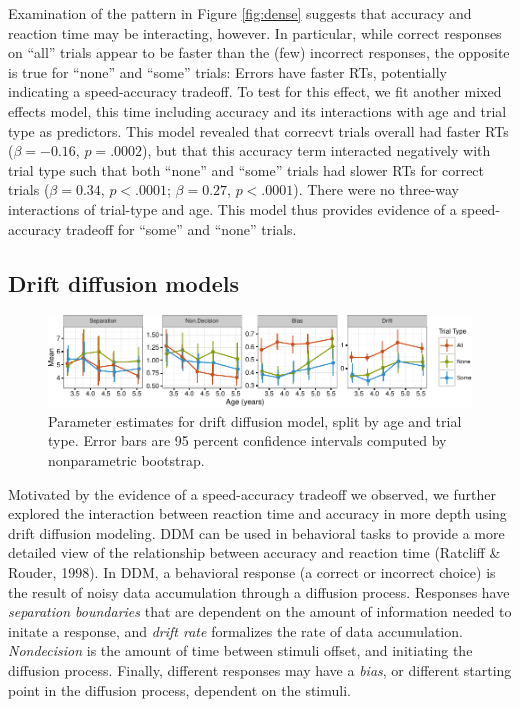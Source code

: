 \documentclass[10pt, letterpaper]{article}
\newenvironment{CodeChunk}{}{}
\begin{document}
Examination of the pattern in Figure \ref{fig:dense} suggests that
accuracy and reaction time may be interacting, however. In particular,
while correct responses on ``all'' trials appear to be faster than the
(few) incorrect responses, the opposite is true for ``none'' and
``some'' trials: Errors have faster RTs, potentially indicating a
speed-accuracy tradeoff. To test for this effect, we fit another mixed
effects model, this time including accuracy and its interactions with
age and trial type as predictors. This model revealed that correcvt
trials overall had faster RTs (\(\beta = -0.16\), \(p = .0002\)), but
that this accuracy term interacted negatively with trial type such that
both ``none'' and ``some'' trials had slower RTs for correct trials
(\(\beta = 0.34\), \(p < .0001\); \(\beta = 0.27\), \(p < .0001\)).
There were no three-way interactions of trial-type and age. This model
thus provides evidence of a speed-accuracy tradeoff for ``some'' and
``none'' trials.

\subsection{Drift diffusion models}\label{drift-diffusion-models}

\begin{CodeChunk}
\begin{figure}[t]

{\centering \includegraphics{figs/devo_param_plot-1} 

}

\caption[Parameter estimates for drift diffusion model, split by age and trial type]{Parameter estimates for drift diffusion model, split by age and trial type. Error bars are 95 percent confidence intervals computed by nonparametric bootstrap.}\label{fig:devo_param_plot}
\end{figure}
\end{CodeChunk}

Motivated by the evidence of a speed-accuracy tradeoff we observed, we
further explored the interaction between reaction time and accuracy in
more depth using drift diffusion modeling. DDM can be used in behavioral
tasks to provide a more detailed view of the relationship between
accuracy and reaction time (Ratcliff \& Rouder, 1998). In DDM, a
behavioral response (a correct or incorrect choice) is the result of
noisy data accumulation through a diffusion process. Responses have
\emph{separation boundaries} that are dependent on the amount of
information needed to initate a response, and \emph{drift rate}
formalizes the rate of data accumulation. \emph{Nondecision} is the
amount of time between stimuli offset, and initiating the diffusion
process. Finally, different responses may have a \emph{bias}, or
different starting point in the diffusion process, dependent on the
stimuli.
\end{document}
